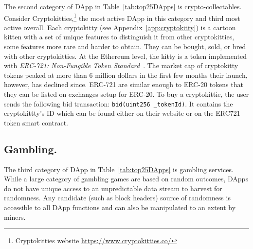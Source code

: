 The second category of DApp in Table~\ref{tab:top25DApps} is crypto-collectables. Consider Cryptokitties,\footnote{Cryptokitties website \url{https://www.cryptokitties.co/}} the most active DApp in this category and third most active overall. Each cryptokitty (see Appendix~\ref{app:cryptokitty}) is a cartoon kitten with a set of unique features to distinguish it from other cryptokitties, some features more rare and harder to obtain. They can be bought, sold, or bred with other cryptokitties. At the Ethereum level, the kitty is a token implemented with \textit{ERC-721: Non-Fungible Token Standard}~\cite{erc721}. The market cap of cryptokitty tokens peaked at more than 6 million dollars in the first few months their launch, however, has declined since. ERC-721 are similar enough to ERC-20 tokens that they can be listed on exchanges setup for ERC-20. To buy a cryptokittie, the user sends the following bid transaction: \texttt{bid(uint256 \_tokenId)}. It contains the cryptokittty's ID which can be found either on their website or on the ERC721 token smart contract. 



\subsection{Gambling.} 

The third category of DApp in Table~\ref{tab:top25DApps} is gambling services. While a large category of gambling games are based on random outcomes, DApps do not have unique access to an unpredictable data stream to harvest for randomness. Any candidate (such as block headers) source of randomness is accessible to all DApp functions and can also be manipulated to an extent by miners.

